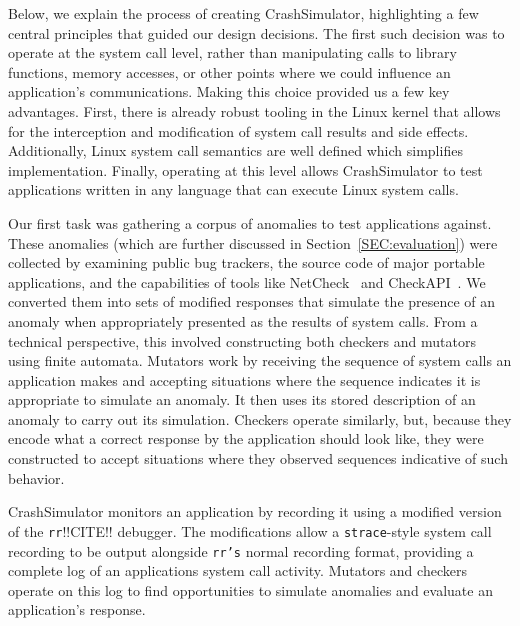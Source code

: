 Below, we explain the process of creating CrashSimulator, highlighting a
few central principles that guided our design decisions. The first such
decision was to operate at the system call level, rather than manipulating
calls to library functions, memory accesses, or other points where we could
influence an application's communications. Making this choice provided us a
few key advantages. First, there is already robust tooling in the Linux
kernel that allows for the interception and modification of system call
results and side effects. Additionally, Linux system call semantics are
well defined which simplifies implementation. Finally, operating at this
level allows CrashSimulator to test applications written in any language
that can execute Linux system calls.

Our first task was
gathering a corpus of anomalies to test applications
against.  These anomalies (which are further discussed
in Section~\ref{SEC:evaluation})
were collected by examining public bug trackers,
the source code of major portable applications, and the capabilities of
tools like NetCheck~\cite{Zhuang_NSDI_2014}
and CheckAPI~\cite{rasley2015detecting}.
We converted them
into sets of modified responses
that simulate the presence of an anomaly when
appropriately presented as the results of system calls.
From a technical perspective,
this involved constructing
both checkers and mutators using finite automata.
Mutators work by receiving the sequence of system calls
an application makes and accepting situations where the sequence indicates
it is appropriate to simulate an anomaly.
It then uses its stored
description of an anomaly
to carry out its simulation.
Checkers operate similarly,
but, because they encode what a
correct response by the application should look like,
they were constructed
to accept situations where they observed sequences indicative of such
behavior.

CrashSimulator monitors an application by
recording it
using a modified version of the {\tt rr}!!CITE!!
debugger.
The modifications allow
a {\tt strace}-style
system call recording to be output alongside {\tt rr's} normal recording
format, providing
a complete log of an applications system call activity. Mutators and
checkers operate on this log to find opportunities to simulate
anomalies and evaluate an application's response.

